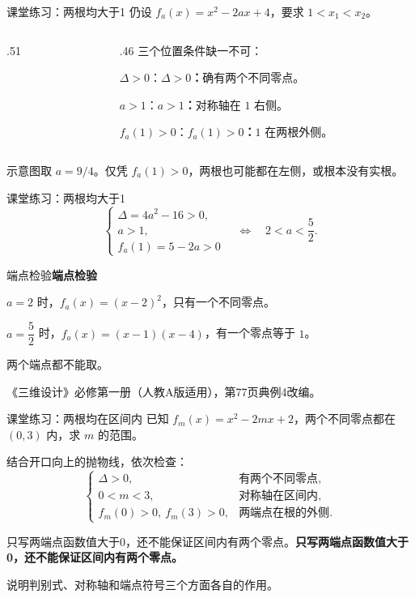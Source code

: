 \documentclass[aspectratio=169,10pt,handout]{beamer}
\newcommand{\key}[1]{{\ifmmode#1\else\bfseries #1\fi}}
\newcommand{\src}[1]{\par\vfill{\color{gray}\scriptsize #1}\par}
\newcommand{\gap}{\par\vspace{2mm}}
\begin{document}
\begin{frame}[t]{课堂练习：两根均大于1}
  \large 仍设 $f_a(x)=x^2-2ax+4$，要求 $1<x_1<x_2$。
  \begin{columns}[T,onlytextwidth]
  \begin{column}{.51\textwidth}
  \end{column}
  \begin{column}{.46\textwidth}
    \pause\large
    三个位置条件缺一不可：
    \gap\par\key{$\Delta>0$：}确有两个不同零点。
    \gap\par\key{$a>1$：}对称轴在 $1$ 右侧。
    \gap\par\key{$f_a(1)>0$：}$1$ 在两根外侧。
  \end{column}
  \end{columns}
  \src{示意图取 $a=9/4$。仅凭 $f_a(1)>0$，两根也可能都在左侧，或根本没有实根。}
\end{frame}

\begin{frame}[t]{课堂练习：两根均大于1}
  \large
  \[\begin{cases}
    \Delta=4a^2-16>0,\\
    a>1,\\
    f_a(1)=5-2a>0
  \end{cases}
  \quad\Longleftrightarrow\quad\boxed{2<a<\frac52}.\]
  \pause
  \gap
  \key{端点检验}
  \par $a=2$ 时，$f_a(x)=(x-2)^2$，只有一个不同零点。
  \gap
  \par $a=\dfrac52$ 时，$f_a(x)=(x-1)(x-4)$，有一个零点等于 $1$。
  \gap 两个端点都不能取。
  \src{《三维设计》必修第一册（人教A版适用），第77页典例4改编。}
\end{frame}

\begin{frame}[t]{课堂练习：两根均在区间内}
  \large
  已知 $f_m(x)=x^2-2mx+2$，两个不同零点都在 $(0,3)$ 内，求 $m$ 的范围。
  \pause
  \gap
  结合开口向上的抛物线，依次检查：
  \[\begin{cases}
      \Delta>0, &\text{有两个不同零点},\\
      0<m<3, &\text{对称轴在区间内},\\
      f_m(0)>0,\ f_m(3)>0, &\text{两端点在根的外侧}.
    \end{cases}\]
  \gap
  \key{只写两端点函数值大于0，还不能保证区间内有两个零点。}
  \src{说明判别式、对称轴和端点符号三个方面各自的作用。}
\end{frame}
\end{document}
